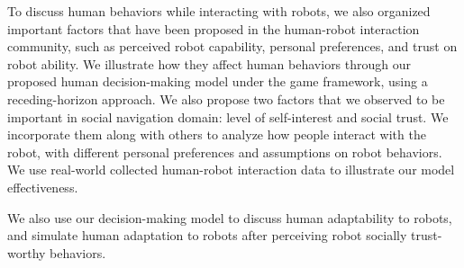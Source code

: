 \documentclass[letterpaper, 10 pt, conference]{ieeeconf}  %
\begin{document}
To discuss human behaviors while interacting with robots, we also organized 
important factors that have been proposed in the human-robot interaction 
community, such as perceived robot capability, personal preferences, and 
trust on robot ability. We illustrate how they affect human behaviors through 
our proposed human decision-making model under the game framework, using a 
receding-horizon approach. We also propose two factors that we observed to be 
important in social navigation 
domain: level of self-interest and social trust. We incorporate them along 
with others to analyze how people interact with the robot, with different 
personal preferences and assumptions on robot 
behaviors. We use real-world collected human-robot interaction data to 
illustrate our model effectiveness. 

We also use our decision-making model to discuss human adaptability to robots,
and simulate human adaptation to robots after perceiving robot 
socially trust-worthy behaviors. 



\end{document}
